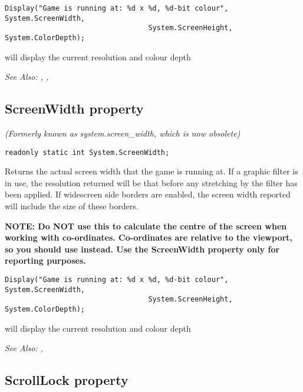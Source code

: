 \begin{verbatim}
Display("Game is running at: %d x %d, %d-bit colour", System.ScreenWidth,
                                  System.ScreenHeight, System.ColorDepth);
\end{verbatim}
will display the current resolution and colour depth

\it{See Also:} ,
,


\subsection{ScreenWidth property}\label{System.ScreenWidth}%

\it{(Formerly known as system.screen_width, which is now obsolete)}

\begin{verbatim}
readonly static int System.ScreenWidth;
\end{verbatim}
Returns the actual screen width that the game is running at.  If a graphic filter is in
use, the resolution returned will be that before any stretching by the filter has been
applied. If widescreen side borders are enabled, the screen width reported will include
the size of these borders.

\bf{NOTE:} Do \bf{NOT} use this to calculate the centre of the screen when working
with co-ordinates. Co-ordinates are relative to the viewport, so you should
use  instead. Use the ScreenWidth
property only for reporting purposes.

\begin{verbatim}
Display("Game is running at: %d x %d, %d-bit colour", System.ScreenWidth,
                                  System.ScreenHeight, System.ColorDepth);
\end{verbatim}
will display the current resolution and colour depth

\it{See Also:} ,


\subsection{ScrollLock property}\label{System.ScrollLock}%

